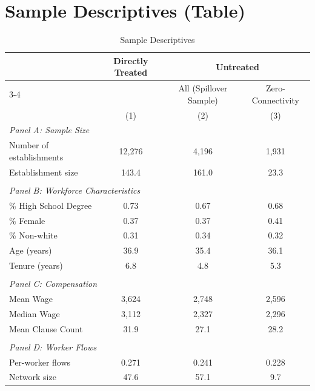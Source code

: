 \documentclass[11pt]{article}
\begin{document}
\section{Sample Descriptives (Table)}
\begin{table}[H]
\centering
\caption{Sample Descriptives}
\footnotesize
\begin{tabular}{lccc}
\toprule\toprule
 & \multicolumn{1}{c}{Directly Treated} & \multicolumn{2}{c}{Untreated} \\
 \cmidrule(lr){3-4}
 & & All (Spillover Sample) & Zero-Connectivity \\
 & (1) & (2) & (3) \\
\midrule
\multicolumn{4}{l}{\textit{Panel A: Sample Size}} \\[0.5ex]
Number of establishments & 12,276 & 4,196 & 1,931 \\
Establishment size & 143.4 & 161.0 & 23.3 \\
&&& \\
\multicolumn{4}{l}{\textit{Panel B: Workforce Characteristics}} \\[0.5ex]
\% High School Degree & 0.73 & 0.67 & 0.68 \\
\% Female & 0.37 & 0.37 & 0.41 \\
\% Non-white & 0.31 & 0.34 & 0.32 \\
Age (years) & 36.9 & 35.4 & 36.1 \\
Tenure (years) & 6.8 & 4.8 & 5.3 \\
&&& \\
\multicolumn{4}{l}{\textit{Panel C: Compensation}} \\[0.5ex]
Mean Wage & 3,624 & 2,748 & 2,596 \\
Median Wage & 3,112 & 2,327 & 2,296 \\
Mean Clause Count & 31.9 & 27.1 & 28.2 \\
&&& \\
\multicolumn{4}{l}{\textit{Panel D: Worker Flows}} \\[0.5ex]
Per-worker flows & 0.271 & 0.241 & 0.228 \\
Network size & 47.6 & 57.1 & 9.7 \\
\bottomrule\bottomrule
\end{tabular}
\begin{minipage}{\linewidth}
    \scriptsize\vspace{4pt}

\end{minipage}
\end{table}
\end{document}
